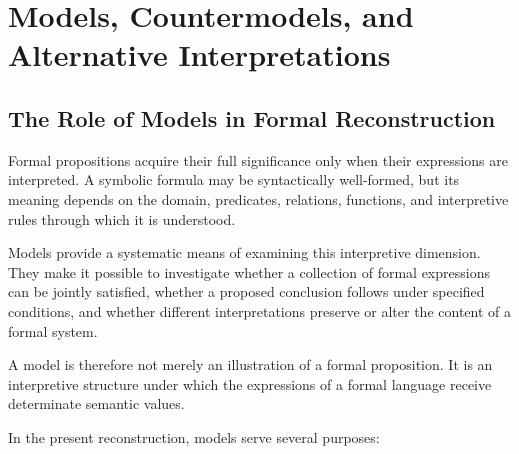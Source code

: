
\section{Models, Countermodels, and Alternative Interpretations}
\label{sec:models-countermodels-and-alternative-interpretations}

\subsection{The Role of Models in Formal Reconstruction}

Formal propositions acquire their full significance only
when their expressions are interpreted. A symbolic formula
may be syntactically well-formed, but its meaning depends
on the domain, predicates, relations, functions, and
interpretive rules through which it is understood.

Models provide a systematic means of examining this
interpretive dimension. They make it possible to investigate
whether a collection of formal expressions can be jointly
satisfied, whether a proposed conclusion follows under
specified conditions, and whether different interpretations
preserve or alter the content of a formal system.

A model is therefore not merely an illustration of a
formal proposition. It is an interpretive structure under
which the expressions of a formal language receive
determinate semantic values.

In the present reconstruction, models serve several
purposes:

